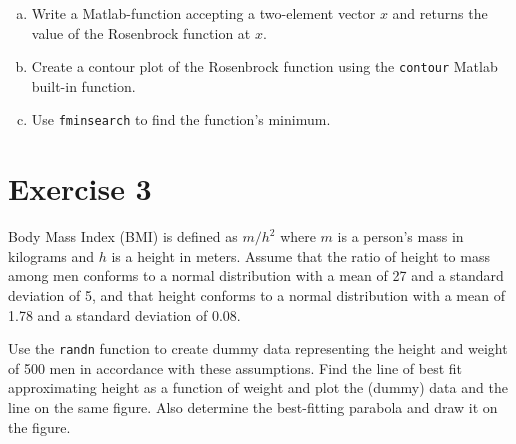 \documentclass{article}
\begin{document}
\begin{enumerate}[a)]
    \item Write a Matlab-function accepting a two-element vector $x$ and returns the value of the Rosenbrock function at $x$.
    \item Create a contour plot of the Rosenbrock function using the \texttt{contour} Matlab built-in function.
    \item Use \texttt{fminsearch} to find the function's minimum.
\end{enumerate}

\section{Exercise 3}

Body Mass Index (BMI) is defined as $m/h^2$ where $m$ is a person's mass in kilograms and $h$ is a height in meters. Assume that the ratio of height to mass among men conforms to a normal distribution with a mean of 27 and a standard deviation of 5, and that height conforms to a normal distribution with a mean of 1.78 and a standard deviation of 0.08.

Use the \texttt{randn} function to create dummy data representing the height and weight of 500 men in accordance with these assumptions. Find the line of best fit approximating height as a function of weight and plot the (dummy) data and the line on the same figure. Also determine the best-fitting parabola and draw it on the figure.
\end{document}
